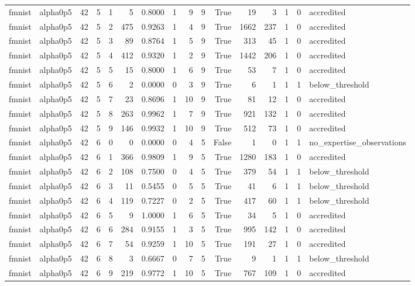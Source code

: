 \begin{tabular}{llrrrrrrrrrrrrrl}
fmnist & alpha0p5 & 42 & 5 & 1 & 5 & 0.8000 & 1 & 9 & 9 & True & 19 & 3 & 1 & 0 & accredited \\
fmnist & alpha0p5 & 42 & 5 & 2 & 475 & 0.9263 & 1 & 4 & 9 & True & 1662 & 237 & 1 & 0 & accredited \\
fmnist & alpha0p5 & 42 & 5 & 3 & 89 & 0.8764 & 1 & 5 & 9 & True & 313 & 45 & 1 & 0 & accredited \\
fmnist & alpha0p5 & 42 & 5 & 4 & 412 & 0.9320 & 1 & 2 & 9 & True & 1442 & 206 & 1 & 0 & accredited \\
fmnist & alpha0p5 & 42 & 5 & 5 & 15 & 0.8000 & 1 & 6 & 9 & True & 53 & 7 & 1 & 0 & accredited \\
fmnist & alpha0p5 & 42 & 5 & 6 & 2 & 0.0000 & 0 & 3 & 9 & True & 6 & 1 & 1 & 1 & below\_threshold \\
fmnist & alpha0p5 & 42 & 5 & 7 & 23 & 0.8696 & 1 & 10 & 9 & True & 81 & 12 & 1 & 0 & accredited \\
fmnist & alpha0p5 & 42 & 5 & 8 & 263 & 0.9962 & 1 & 7 & 9 & True & 921 & 132 & 1 & 0 & accredited \\
fmnist & alpha0p5 & 42 & 5 & 9 & 146 & 0.9932 & 1 & 10 & 9 & True & 512 & 73 & 1 & 0 & accredited \\
fmnist & alpha0p5 & 42 & 6 & 0 & 0 & 0.0000 & 0 & 4 & 5 & False & 1 & 0 & 1 & 1 & no\_expertise\_observations \\
fmnist & alpha0p5 & 42 & 6 & 1 & 366 & 0.9809 & 1 & 9 & 5 & True & 1280 & 183 & 1 & 0 & accredited \\
fmnist & alpha0p5 & 42 & 6 & 2 & 108 & 0.7500 & 0 & 4 & 5 & True & 379 & 54 & 1 & 1 & below\_threshold \\
fmnist & alpha0p5 & 42 & 6 & 3 & 11 & 0.5455 & 0 & 5 & 5 & True & 41 & 6 & 1 & 1 & below\_threshold \\
fmnist & alpha0p5 & 42 & 6 & 4 & 119 & 0.7227 & 0 & 2 & 5 & True & 417 & 60 & 1 & 1 & below\_threshold \\
fmnist & alpha0p5 & 42 & 6 & 5 & 9 & 1.0000 & 1 & 6 & 5 & True & 34 & 5 & 1 & 0 & accredited \\
fmnist & alpha0p5 & 42 & 6 & 6 & 284 & 0.9155 & 1 & 3 & 5 & True & 995 & 142 & 1 & 0 & accredited \\
fmnist & alpha0p5 & 42 & 6 & 7 & 54 & 0.9259 & 1 & 10 & 5 & True & 191 & 27 & 1 & 0 & accredited \\
fmnist & alpha0p5 & 42 & 6 & 8 & 3 & 0.6667 & 0 & 7 & 5 & True & 9 & 1 & 1 & 1 & below\_threshold \\
fmnist & alpha0p5 & 42 & 6 & 9 & 219 & 0.9772 & 1 & 10 & 5 & True & 767 & 109 & 1 & 0 & accredited \\

\end{tabular}
